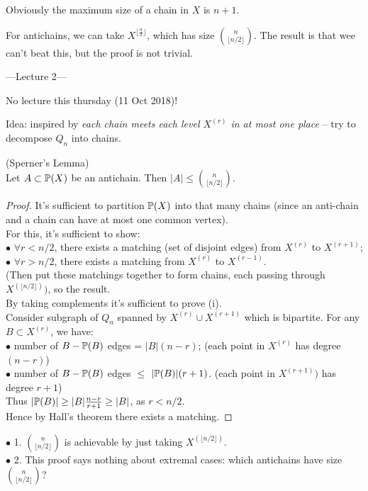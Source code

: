 \documentclass[a4paper]{article}
\begin{document}
Obviously the maximum size of a chain in $X$ is $n+1$.

For antichains, we can take $X^{\lfloor\frac{n}{2}\rfloor}$, which has size ${n \choose {\lfloor n/2 \rfloor}}$. The result is that wee can't beat this, but the proof is not trivial.

---Lecture 2---

No lecture this thursday (11 Oct 2018)!

Idea: inspired by \emph{each chain meets each level $X^{(r)}$ in at most one place} -- try to decompose $Q_n$ into chains.

\begin{thm} (Sperner's Lemma)\\
    Let $A \subset \P(X)$ be an antichain. Then $|A| \leq {n \choose {\lfloor n/2 \rfloor}}$.
    \begin{proof}
        It's sufficient to partition $\P(X)$ into that many chains (since an anti-chain and a chain can have at most one common vertex).\\
        For this, it's sufficient to show:\\
        $\bullet$ $\forall r < n/2$, there exists a matching (set of disjoint edges) from $X^{(r)}$ to $X^{(r+1)}$;\\
        $\bullet$ $\forall r > n/2$, there exists a matching from $X^{(r)}$ to $X^{(r-1)}$.\\
        (Then put these matchings together to form chains, each passing through $X^{(\lfloor n/2 \rfloor)})$, so the result.\\
        By taking complements it's sufficient to prove (i).\\
        Consider subgraph of $Q_n$ spanned by $X^{(r)} \cup X^{(r+1)}$ which is bipartite. For any $B \subset X^{(r)}$, we have:\\
        $\bullet$ number of $B-\P(B)$ edges = $|B| (n-r)$; (each point in $X^{(r)}$ has degree $(n-r)$)\\
        $\bullet$ number of $B-\P(B)$ edges $\leq$ $|\P(B)|(r+1)$. (each point in $X^{(r+1)})$ has degree $r+1$)\\
        Thus $|\P(B)| \geq |B| \frac{n-r}{r+1} \geq |B|$, as $r < n/2$.\\
        Hence by Hall's theorem there exists a matching.
    \end{proof}
\end{thm}

\begin{rem}
    $\bullet$ 1. ${n \choose {\lfloor n/2 \rfloor}}$ is achievable by just taking $X^{(\lfloor n/2 \rfloor)}$.\\
    $\bullet$ 2. This proof says nothing about extremal cases: which antichains have size ${n \choose {\lfloor n/2 \rfloor}}$?
\end{rem}
\end{document}
